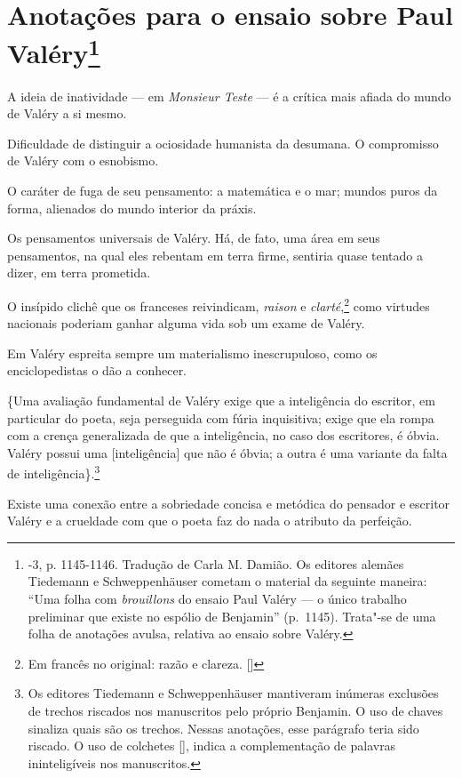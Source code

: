 
\chapter{Anotações para o ensaio sobre Paul Valéry\footnote[*]{-3, p. 1145-1146. Tradução de Carla M. Damião. Os
  editores alemães Tiedemann e Schweppenhäuser cometam o material da
  seguinte maneira: ``Uma folha com \emph{brouillons} do ensaio Paul
  Valéry --- o único trabalho preliminar que existe no espólio de
  Benjamin'' (p.~1145). Trata"-se de uma folha de anotações avulsa, relativa ao ensaio sobre Valéry.}}

A ideia de inatividade --- em \emph{Monsieur Teste} --- é a crítica mais afiada do
mundo de Valéry a si mesmo.

Dificuldade de distinguir a ociosidade humanista da desumana. O
compromisso de Valéry com o esnobismo.

O caráter de fuga de seu pensamento: a matemática e o mar; mundos puros
da forma, alienados do mundo interior da práxis.

Os pensamentos universais de Valéry. Há, de fato, uma área em seus
pensamentos, na qual eles rebentam em terra firme, sentiria quase tentado
a dizer, em terra prometida.

O insípido clichê que os franceses reivindicam, \emph{raison} e
\emph{clarté},\footnote{Em francês no original: razão e clareza. []} como virtudes nacionais poderiam ganhar alguma vida
sob um exame de Valéry.

Em Valéry espreita sempre um materialismo inescrupuloso, como os
enciclopedistas o dão a conhecer.

\{Uma avaliação fundamental de Valéry exige que a inteligência do escritor,
em particular do poeta, seja perseguida com fúria inquisitiva; exige que
ela rompa com a crença generalizada de que a inteligência, no caso dos
escritores, é óbvia. Valéry possui uma {[}inteligência{]} que não é %
óbvia; a outra é uma variante da falta de inteligência\}.\footnote{Os editores Tiedemann e Schweppenhäuser mantiveram inúmeras
exclusões de trechos riscados nos manuscritos pelo próprio Benjamin. O uso de chaves {} sinaliza quais são os trechos. Nessas anotações, esse parágrafo teria sido riscado. O uso de colchetes [], indica a complementação de palavras ininteligíveis nos manuscritos.}

Existe uma conexão entre a sobriedade concisa e metódica do
pensador e escritor Valéry e a crueldade com que o poeta faz do nada o
atributo da perfeição.

